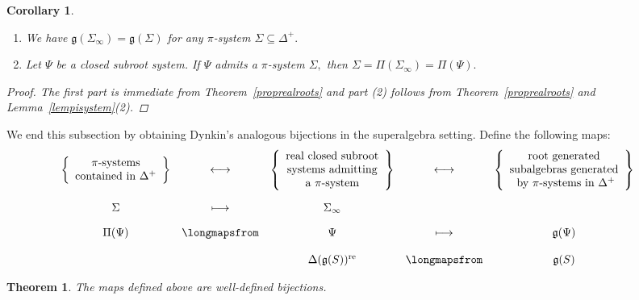 \documentclass[11pt,reqno]{amsart}
\theoremstyle{plain}
\newtheorem{thm}{Theorem}
\newtheorem*{cor}{Corollary}%
\theoremstyle{definition}
\theoremstyle{remark}
\newcommand{\lie}[1]{\mathfrak{#1}}
\numberwithin{equation}{section}
\begin{document}
\begin{cor}\label{cormainprop}
    \begin{enumerate}
        \item We have $\lie g(\Sigma_{\infty})=\lie g(\Sigma)$ for any $\pi$-system $\Sigma\subseteq\Delta^{+}.$
        \item Let $\Psi$ be a closed subroot system. If $\Psi$ admits a $\pi$-system $\Sigma,$ then $\Sigma=\Pi(\Sigma_\infty)=\Pi(\Psi).$
    \end{enumerate}
     \begin{proof}
           The first part is immediate from Theorem~\ref{proprealroots} and part (2) follows from Theorem~\ref{proprealroots} and Lemma~\ref{lempisystem}(2).
        \end{proof}
\end{cor}
We end this subsection by obtaining Dynkin's analogous bijections in the superalgebra setting. Define the following maps:
$$\begin{array}{cccccr}
     \vspace{10pt}
     \left\{\begin{array}{c}
            \pi\text{-systems}  \\
             \text{contained in } \Delta^+
       \end{array}\right\}  & \longleftrightarrow & \left\{\begin{array}{c}
            \text{real closed subroot}  \\
             \text{systems admitting}\\
             \text{a }\pi\text{-system}
       \end{array}\right\}& \longleftrightarrow & \left\{\begin{array}{c}
            \text{root generated}\\
             \text{subalgebras generated} \\
             \text{  by }\pi\text{-systems in }\Delta^+
       \end{array}\right\} \\ \vspace{10pt}
        \Sigma  & \longmapsto & \Sigma_\infty\\
    \Pi(\Psi) & \longmapsfrom &\Psi & \longmapsto& \lie g(\Psi)&\\ \\
    &&\Delta(\lie g(S))^{\mathrm{re}}& \longmapsfrom &\lie g(S)&
\end{array}$$
\begin{thm}\label{dynbij}
    The maps defined above are well-defined bijections.
\end{thm}
\end{document}
